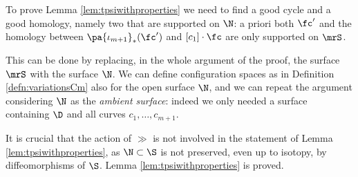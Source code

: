 To prove Lemma \ref{lem:tpsiwithproperties} we need to find a good cycle and
a good homology, namely two that are supported on $\N$: a priori both $\fc'$ and the homology
between $\pa{\iota_{m+1}}_*(\fc')$ and $[c_1]\cdot\fc$ are only supported on $\mrS$.

This can be done by replacing, in the whole argument of the proof, the surface $\mrS$ with the surface $\N$.
We can define configuration spaces as in Definition \ref{defn:variationsCm} also for the open surface
$\N$, and we can repeat the argument considering $\N$ as the \emph{ambient surface}:
indeed we only needed a surface containing $\D$ and all curves $c_1,\dots,c_{m+1}$.

It is crucial that the action of $\gg$ is not involved in the statement of Lemma
\ref{lem:tpsiwithproperties}, as $\N\subset\S$ is not preserved, even up to isotopy,
by diffeomorphisms of $\S$.
Lemma \ref{lem:tpsiwithproperties} is proved.

